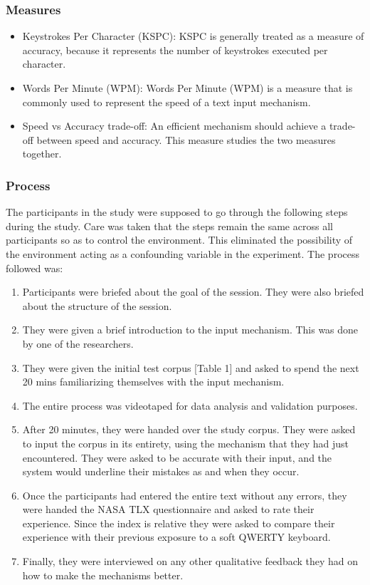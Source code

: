 \subsubsection{Measures}
\begin{itemize}
	\item Keystrokes Per Character (KSPC): KSPC is generally treated as a measure of accuracy, because it
represents the number of keystrokes executed per character.
	\item Words Per Minute (WPM): Words Per Minute (WPM) is a measure that is commonly used to represent
the speed of a text input mechanism.
	\item Speed vs Accuracy trade-off: An efficient mechanism should achieve a trade-off between speed and accuracy. This measure studies the two measures together.
\end{itemize}
\subsubsection{Process}

The participants in the study were supposed to go through the
following steps during the study. Care was taken that the steps remain
the same across all participants so as to control the
environment. This eliminated the
possibility of the environment acting as a confounding variable in the
experiment. The process followed was:

\begin{enumerate}
\item Participants were briefed about the goal of the session. They
  were also briefed about the structure of the session.
\item They were given a brief introduction to the input
  mechanism. This was done by one of the researchers.
\item They were given the initial test corpus [Table 1] and asked to spend the next 20
  mins familiarizing themselves with the input mechanism.
\item The entire process was videotaped for data analysis and
  validation purposes.
\item After 20 minutes, they were handed over the study
  corpus. They were asked to input the corpus in its entirety, using
  the mechanism that they had just encountered. They were asked to be
  accurate with their input, and the system would underline their
  mistakes as and when they occur.
\item Once the participants had entered the entire text without any
  errors, they were handed the NASA TLX questionnaire and asked to rate
  their experience. Since the index is relative they were asked to
  compare their experience with their previous exposure to a soft
  QWERTY keyboard. 
\item Finally, they were interviewed on any other qualitative feedback
  they had on how to make the mechanisms better.
\end{enumerate}
	